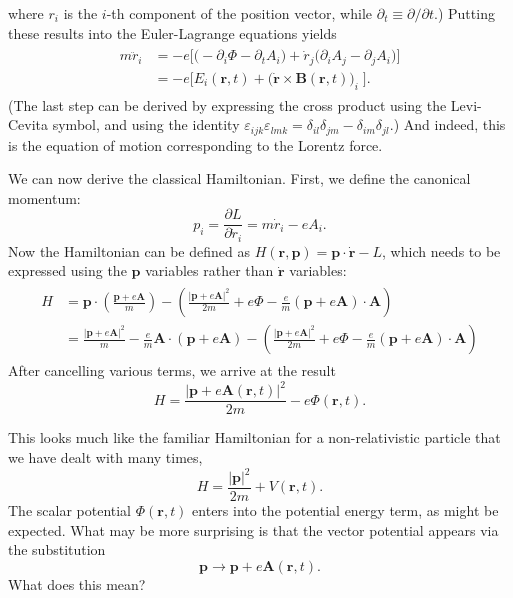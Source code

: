 \documentclass[pra,12pt]{revtex4}
\begin{document}
where $r_i$ is the $i$-th component of the position vector, while
$\partial_t \equiv \partial/\partial t$.)  Putting these results into
the Euler-Lagrange equations yields
\begin{align}
  \begin{aligned}
    m\ddot{r}_i &=
    -e\Big[\Big(-\partial_i \Phi - \partial_t A_i\Big)
      + \dot{r}_j \Big( \partial_i A_j - \partial_j A_i\Big) \Big] \\
    &= -e \Big[E_i(\mathbf{r},t) + \big(\dot{\mathbf{r}} \times
      \mathbf{B}(\mathbf{r},t) \big)_i\; \Big].
  \end{aligned}
\end{align}
(The last step can be derived by expressing the cross product using
the Levi-Cevita symbol, and using the identity $\varepsilon_{ijk}
\varepsilon_{lmk} = \delta_{il} \delta_{jm} - \delta_{im}
\delta_{jl}$.)  And indeed, this is the equation of motion
corresponding to the Lorentz force.

We can now derive the classical Hamiltonian.  First, we define the
canonical momentum:
\begin{equation}
  p_i = \frac{\partial L}{\partial \dot{r}_i} = m\dot{r}_i - e A_i.
\end{equation}
Now the Hamiltonian can be defined as $H(\mathbf{r},\mathbf{p}) =
\mathbf{p} \cdot \dot{\mathbf{r}} - L$, which needs to be expressed
using the $\mathbf{p}$ variables rather than $\dot{\mathbf{r}}$
variables:
\begin{align}
  \begin{aligned}
    H &= \mathbf{p}\cdot \left(\frac{\mathbf{p}+e\mathbf{A}}{m}\right)
    - \left(\frac{|\mathbf{p}+e\mathbf{A}|^2}{2m}
    + e\Phi - \frac{e}{m}(\mathbf{p}+e\mathbf{A})\cdot \mathbf{A}\right) \\
    &= \frac{|\mathbf{p}+e\mathbf{A}|^2}{m}
    - \frac{e}{m}\mathbf{A}\cdot \left(\mathbf{p}+e\mathbf{A}\right)
    - \left(\frac{|\mathbf{p}+e\mathbf{A}|^2}{2m}
    + e\Phi - \frac{e}{m}(\mathbf{p}+e\mathbf{A})\cdot \mathbf{A}\right)
  \end{aligned}
\end{align}
After cancelling various terms, we arrive at the result
$$\boxed{\qquad H = \frac{|\mathbf{p}+e\mathbf{A}(\mathbf{r},t)|^2}{2m} - e\Phi(\mathbf{r},t).\qquad}$$

This looks much like the familiar Hamiltonian for a non-relativistic
particle that we have dealt with many times,
\begin{equation}
  H = \frac{|\mathbf{p}|^2}{2m} + V(\mathbf{r},t).
\end{equation}
The scalar potential $\Phi(\mathbf{r},t)$ enters into the potential
energy term, as might be expected.  What may be more surprising is
that the vector potential appears via the substitution
\begin{equation}
  \mathbf{p} \rightarrow \mathbf{p} + e\mathbf{A}(\mathbf{r},t).  
\end{equation}
What does this mean?
\end{document}
